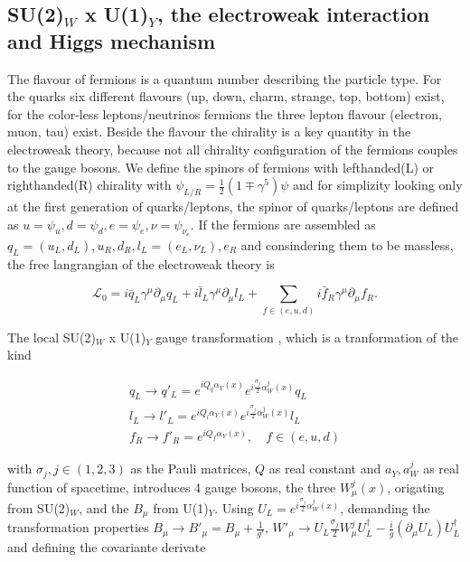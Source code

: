 \subsection{SU(2)$_{W}$ x U(1)$_{Y}$, the electroweak interaction and Higgs mechanism}
\label{sec:section_1_1_3}

The flavour of fermions is a quantum number describing the particle type. For the quarks six different flavours (up, down, charm, strange, top, bottom) exist, for the color-less leptons/neutrinos fermions the three lepton flavour (electron, muon, tau) exist. Beside the flavour the chirality is a key quantity in the electroweak theory, because not all chirality configuration of the fermions couples to the gauge bosons. We define the spinors of fermions with lefthanded(L) or righthanded(R) chirality with $\psi_{L/R} = \frac{1}{2}(1\mp \gamma^{5})\psi$ and for simplizity looking only at the first generation of quarks/leptons, the spinor of quarks/leptons are defined as $u = \psi_{u}, d = \psi_{d}, e = \psi_{e}, \nu = \psi_{\nu_{e}}$. If the fermions are assembled as $q_{L} = (u_{L}, d_{L}), u_{R}, d_{R}, l_{L} = (e_{L}, \nu_{L}), e_{R}$ and consindering them to be massless, the free langrangian of the electroweak theory is

\begin{equation}
	\label{eq:eq_1_5}
	\mathcal{L}_{0} = i\bar{q}_{L}\gamma^{\mu}\partial_{\mu}q_{L} + i\bar{l}_{L}\gamma^{\mu}\partial_{\mu}l_{L} + \sum_{f \in (e, u, d)} i\bar{f}_{R}\gamma^{\mu}\partial_{\mu}f_{R}.
\end{equation}

The local SU(2)$_{W}$ x U(1)$_{Y}$ gauge transformation \cite{EWK}, which is a tranformation of the kind

\begin{equation}
	\label{eq:eq_1_6}
	\begin{split}
		q_{L} \rightarrow q'_{L} = e^{iQ_{q} \alpha_{Y}(x)} e^{i\frac{\sigma_{j}}{2}\alpha^{j}_{W}(x)}q_{L} \\
		l_{L} \rightarrow l'_{L} = e^{iQ_{l} \alpha_{Y}(x)} e^{i\frac{\sigma_{j}}{2}\alpha^{j}_{W}(x)}l_{L} \\
		f_{R} \rightarrow f'_{R} = e^{iQ_{f} \alpha_{Y}(x)}, \quad f \in (e, u, d)
	\end{split}			
\end{equation}

with $\sigma_{j}, j \in (1,2,3)$ as the Pauli matrices, $Q$ as real constant and $a_{Y}, a^{j}_{W}$ as real function of spacetime, introduces 4 gauge bosons, the three $W^{j}_{\mu}(x)$, origating from SU(2)$_{W}$, and the $B_{\mu}$ from U(1)$_{Y}$. Using $U_{L} = e^{i\frac{\sigma_{j}}{2}\alpha^{j}_{W}(x)}$, demanding the transformation properties $B_{\mu} \rightarrow B'_{\mu} = B_{\mu} + \frac{1}{g'}$, $W'_{\mu} \rightarrow U_{L}\frac{\sigma_{j}}{2}W_{\mu}^{j}U_{L}^{\dagger} - \frac{i}{g}(\partial_{\mu}U_{L})U_{L}^{\dagger}$ and defining the covariante derivate 

